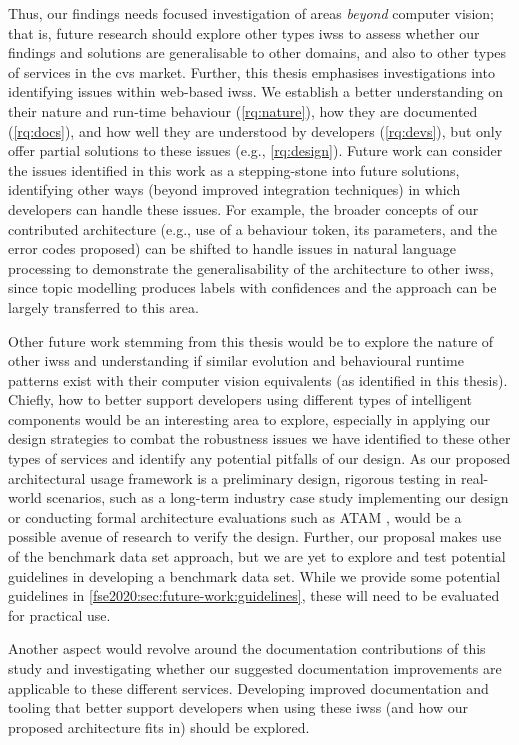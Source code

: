 Thus, our findings needs focused investigation of areas \textit{beyond} computer vision; that is, future research should explore other types \glspl{iws} to assess whether our findings and solutions are generalisable to other domains, and also to other types of services in the \gls{cvs} market. Further, this thesis emphasises investigations into identifying issues within web-based \glspl{iws}. We establish a better understanding on their nature and run-time behaviour  (\ref{rq:nature}), how they are documented (\ref{rq:docs}), and how well they are understood by developers (\ref{rq:devs}), but only offer partial solutions to these issues (e.g., \ref{rq:design}). Future work can consider the issues identified in this work as a stepping-stone into future solutions, identifying other ways (beyond improved integration techniques) in which developers can handle these issues. For example, the broader concepts of our contributed architecture (e.g., use of a behaviour token, its parameters, and the error codes proposed) can be shifted to handle issues in natural language processing to demonstrate the generalisability of the architecture to other \glspl{iws}, since topic modelling produces labels with confidences and the approach can be largely transferred to this area.

Other future work stemming from this thesis would be to explore the nature of other \glspl{iws} and understanding if similar evolution and behavioural runtime patterns exist with their computer vision equivalents (as identified in this thesis). Chiefly, how to better support developers using different types of intelligent components would be an interesting area to explore, especially in applying our design strategies to combat the robustness issues we have identified to these other types of services and identify any potential pitfalls of our design. As our proposed architectural usage framework is a preliminary design, rigorous testing in real-world scenarios, such as a long-term industry case study implementing our design or conducting formal architecture evaluations such as ATAM \citep{Kazman2000}, would be a possible avenue of research to verify the design. Further, our proposal makes use of the benchmark data set approach, but we are yet to explore and test potential guidelines in developing a benchmark data set. While we provide some potential guidelines in \cref{fse2020:sec:future-work:guidelines}, these will need to be evaluated for practical use.

Another aspect would revolve around the documentation contributions of this study and investigating whether our suggested documentation improvements are applicable to these different services. Developing improved documentation and tooling that better support developers when using these \glspl{iws} (and how our proposed architecture fits in) should be explored. 


